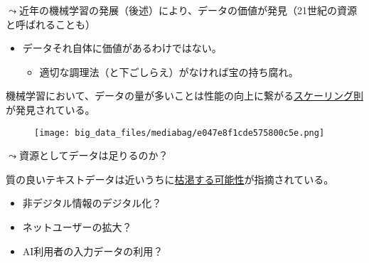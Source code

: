 \documentclass[
  xelatex,
  ja=standard]{bxjsarticle}
\providecommand{\tightlist}{%
  \setlength{\itemsep}{0pt}\setlength{\parskip}{0pt}}\usepackage{longtable,booktabs,array}
\begin{document}
\(\leadsto\)近年の機械学習の発展（後述）により、データの価値が発見（21世紀の資源と呼ばれることも）

\begin{itemize}
\tightlist
\item
  データそれ自体に価値があるわけではない。

  \begin{itemize}
  \tightlist
  \item
    適切な調理法（と下ごしらえ）がなければ宝の持ち腐れ。
  \end{itemize}
\end{itemize}

機械学習において、データの量が多いことは性能の向上に繋がる\href{https://deeplearning.hatenablog.com/entry/scaling_law}{スケーリング則}が発見されている。

\begin{figure}[htpb]

{\centering \texttt{[image: big\_data\_files/mediabag/e047e8f1cde575800c5e.png]}

}

\caption{\citet{kaplan2020}}

\end{figure}

\(\leadsto\)資源としてデータは足りるのか？

質の良いテキストデータは近いうちに\href{https://www.technologyreview.jp/s/291329/we-could-run-out-of-data-to-train-ai-language-programs/}{枯渇する可能性}が指摘されている。

\begin{itemize}
\tightlist
\item
  非デジタル情報のデジタル化？
\item
  ネットユーザーの拡大？
\item
  AI利用者の入力データの利用？
\end{itemize}


  
\end{document}
